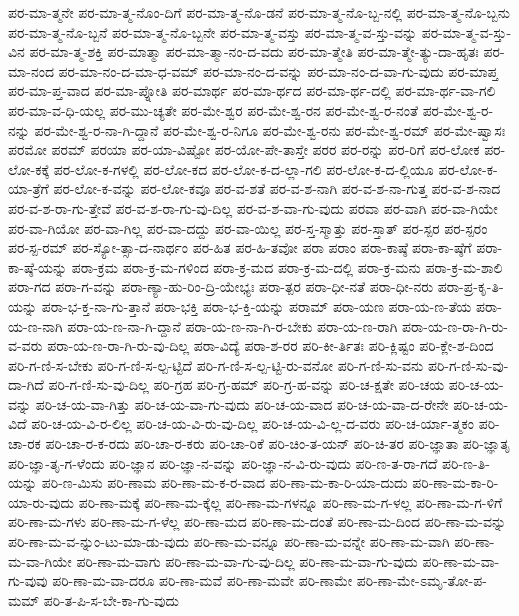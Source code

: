 {ಪರ-ಮಾ-ತ್ಮನೇ
ಪರ-ಮಾ-ತ್ಮ-ನೊಂ-ದಿಗೆ
ಪರ-ಮಾ-ತ್ಮ-ನೊ-ಡನೆ
ಪರ-ಮಾ-ತ್ಮ-ನೊ-ಬ್ಬ-ನಲ್ಲಿ
ಪರ-ಮಾ-ತ್ಮ-ನೊ-ಬ್ಬನು
ಪರ-ಮಾ-ತ್ಮ-ನೊ-ಬ್ಬನೆ
ಪರ-ಮಾ-ತ್ಮ-ನೊ-ಬ್ಬನೇ
ಪರ-ಮಾ-ತ್ಮ-ವಸ್ತು
ಪರ-ಮಾ-ತ್ಮ-ವ-ಸ್ತು-ವನ್ನು
ಪರ-ಮಾ-ತ್ಮ-ವ-ಸ್ತು-ವಿನ
ಪರ-ಮಾ-ತ್ಮ-ಶಕ್ತಿ
ಪರ-ಮಾತ್ಮಾ
ಪರ-ಮಾ-ತ್ಮಾ-ನಂ-ದ-ವದು
ಪರ-ಮಾ-ತ್ಮೇತಿ
ಪರ-ಮಾ-ತ್ಮೇ-ತ್ಯು-ದಾ-ಹೃತಃ
ಪರ-ಮಾ-ನಂದ
ಪರ-ಮಾ-ನಂ-ದ-ಮಾ-ಧ-ವಮ್
ಪರ-ಮಾ-ನಂ-ದ-ವನ್ನು
ಪರ-ಮಾ-ನಂ-ದ-ವಾ-ಗು-ವುದು
ಪರ-ಮಾಪ್ತ
ಪರ-ಮಾ-ಪ್ತ-ವಾದ
ಪರ-ಮಾ-ಪ್ನೋತಿ
ಪರ-ಮಾರ್ಥ
ಪರ-ಮಾ-ರ್ಥದ
ಪರ-ಮಾ-ರ್ಥ-ದಲ್ಲಿ
ಪರ-ಮಾ-ರ್ಥ-ವಾ-ಗಲಿ
ಪರ-ಮಾ-ವ-ಧಿ-ಯಲ್ಲ
ಪರ-ಮು-ಚ್ಯತೇ
ಪರ-ಮೇ-ಶ್ವರ
ಪರ-ಮೇ-ಶ್ವ-ರನ
ಪರ-ಮೇ-ಶ್ವ-ರ-ನಂತೆ
ಪರ-ಮೇ-ಶ್ವ-ರ-ನನ್ನು
ಪರ-ಮೇ-ಶ್ವ-ರ-ನಾ-ಗಿ-ದ್ದಾನೆ
ಪರ-ಮೇ-ಶ್ವ-ರ-ನಿಗೂ
ಪರ-ಮೇ-ಶ್ವ-ರನು
ಪರ-ಮೇ-ಶ್ವ-ರಮ್
ಪರ-ಮೇ-ಷ್ವಾಸಃ
ಪರಮೋ
ಪರಮ್
ಪರಯಾ
ಪರ-ಯಾ-ವಿಷ್ಟೋ
ಪರ-ಯೋ-ಪೇ-ತಾಸ್ತೇ
ಪರರ
ಪರ-ರನ್ನು
ಪರ-ರಿಗೆ
ಪರ-ಲೋಕ
ಪರ-ಲೋ-ಕಕ್ಕೆ
ಪರ-ಲೋ-ಕ-ಗಳಲ್ಲಿ
ಪರ-ಲೋ-ಕದ
ಪರ-ಲೋ-ಕ-ದ-ಲ್ಲಾ-ಗಲಿ
ಪರ-ಲೋ-ಕ-ದ-ಲ್ಲಿಯೂ
ಪರ-ಲೋ-ಕ-ಯಾ-ತ್ರೆಗೆ
ಪರ-ಲೋ-ಕ-ವನ್ನು
ಪರ-ಲೋ-ಕವೂ
ಪರ-ವ-ಶತೆ
ಪರ-ವ-ಶ-ನಾಗಿ
ಪರ-ವ-ಶ-ನಾ-ಗುತ್ತ
ಪರ-ವ-ಶ-ನಾದ
ಪರ-ವ-ಶ-ರಾ-ಗು-ತ್ತೇವೆ
ಪರ-ವ-ಶ-ರಾ-ಗು-ವು-ದಿಲ್ಲ
ಪರ-ವ-ಶ-ವಾ-ಗು-ವುದು
ಪರವಾ
ಪರ-ವಾಗಿ
ಪರ-ವಾ-ಗಿಯೇ
ಪರ-ವಾ-ಗಿಯೋ
ಪರ-ವಾ-ಗಿಲ್ಲ
ಪರ-ವಾ-ದದ್ದು
ಪರ-ವಾ-ಯಿಲ್ಲ
ಪರ-ಸ್ತ-ಸ್ಮಾತ್ತು
ಪರ-ಸ್ತಾತ್
ಪರ-ಸ್ಪರ
ಪರ-ಸ್ಪರಂ
ಪರ-ಸ್ಪ-ರಮ್
ಪರ-ಸ್ಯೋ-ತ್ಸಾ-ದ-ನಾರ್ಥಂ
ಪರ-ಹಿತ
ಪರ-ಹಿ-ತವೋ
ಪರಾ
ಪರಾಂ
ಪರಾ-ಕಾಷ್ಠೆ
ಪರಾ-ಕಾ-ಷ್ಠೆಗೆ
ಪರಾ-ಕಾ-ಷ್ಠೆ-ಯನ್ನು
ಪರಾ-ಕ್ರಮ
ಪರಾ-ಕ್ರ-ಮ-ಗಳಿಂದ
ಪರಾ-ಕ್ರ-ಮದ
ಪರಾ-ಕ್ರ-ಮ-ದಲ್ಲಿ
ಪರಾ-ಕ್ರ-ಮನು
ಪರಾ-ಕ್ರ-ಮ-ಶಾಲಿ
ಪರಾ-ಗದ
ಪರಾ-ಗ-ವನ್ನು
ಪರಾ-ಣ್ಯಾ-ಹು-ರಿಂ-ದ್ರಿ-ಯೇಭ್ಯಃ
ಪರಾ-ತ್ಪರ
ಪರಾ-ಧೀ-ನತೆ
ಪರಾ-ಧೀ-ನರು
ಪರಾ-ಪ್ರ-ಕೃ-ತಿ-ಯನ್ನು
ಪರಾ-ಭ-ಕ್ತ-ನಾ-ಗು-ತ್ತಾನೆ
ಪರಾ-ಭಕ್ತಿ
ಪರಾ-ಭ-ಕ್ತಿ-ಯನ್ನು
ಪರಾಮ್
ಪರಾ-ಯಣ
ಪರಾ-ಯ-ಣ-ತೆಯ
ಪರಾ-ಯ-ಣ-ನಾಗಿ
ಪರಾ-ಯ-ಣ-ನಾ-ಗಿ-ದ್ದಾನೆ
ಪರಾ-ಯ-ಣ-ನಾ-ಗಿ-ರ-ಬೇಕು
ಪರಾ-ಯ-ಣ-ರಾಗಿ
ಪರಾ-ಯ-ಣ-ರಾ-ಗಿ-ರು-ವ-ವರು
ಪರಾ-ಯ-ಣ-ರಾ-ಗಿ-ರು-ವು-ದಿಲ್ಲ
ಪರಾ-ವಿದ್ಯೆ
ಪರಾ-ಶ-ರರ
ಪರಿ-ಕೀ-ರ್ತಿತಃ
ಪರಿ-ಕ್ಲಿಷ್ಟಂ
ಪರಿ-ಕ್ಲೇ-ಶ-ದಿಂದ
ಪರಿ-ಗ-ಣಿ-ಸ-ಬೇಕು
ಪರಿ-ಗ-ಣಿ-ಸ-ಲ್ಪ-ಟ್ಟಿದೆ
ಪರಿ-ಗ-ಣಿ-ಸ-ಲ್ಪ-ಟ್ಟಿ-ರು-ವನೋ
ಪರಿ-ಗ-ಣಿ-ಸು-ವನು
ಪರಿ-ಗ-ಣಿ-ಸು-ವು-ದಾ-ಗಿದೆ
ಪರಿ-ಗ-ಣಿ-ಸು-ವು-ದಿಲ್ಲ
ಪರಿ-ಗ್ರಹ
ಪರಿ-ಗ್ರ-ಹಮ್
ಪರಿ-ಗ್ರ-ಹ-ವನ್ನು
ಪರಿ-ಚ-ಕ್ಷತೇ
ಪರಿ-ಚಯ
ಪರಿ-ಚ-ಯ-ವನ್ನು
ಪರಿ-ಚ-ಯ-ವಾ-ಗಿತ್ತು
ಪರಿ-ಚ-ಯ-ವಾ-ಗು-ವುದು
ಪರಿ-ಚ-ಯ-ವಾದ
ಪರಿ-ಚ-ಯ-ವಾ-ದ-ರೇನೇ
ಪರಿ-ಚ-ಯ-ವಿದೆ
ಪರಿ-ಚ-ಯ-ವಿ-ರ-ಲಿಲ್ಲ
ಪರಿ-ಚ-ಯ-ವಿ-ರು-ವು-ದಿಲ್ಲ
ಪರಿ-ಚ-ಯ-ವಿ-ಲ್ಲ-ದ-ವರು
ಪರಿ-ಚ-ರ್ಯಾ-ತ್ಮಕಂ
ಪರಿ-ಚಾ-ರಕ
ಪರಿ-ಚಾ-ರ-ಕ-ರದು
ಪರಿ-ಚಾ-ರ-ಕರು
ಪರಿ-ಚಾ-ರಿಕೆ
ಪರಿ-ಚಿಂ-ತ-ಯನ್
ಪರಿ-ಚಿ-ತರ
ಪರಿ-ಜ್ಞಾತಾ
ಪರಿ-ಜ್ಞಾತೃ
ಪರಿ-ಜ್ಞಾ-ತೃ-ಗ-ಳೆಂದು
ಪರಿ-ಜ್ಞಾನ
ಪರಿ-ಜ್ಞಾ-ನ-ವನ್ನು
ಪರಿ-ಜ್ಞಾ-ನ-ವಿ-ರು-ವುದು
ಪರಿ-ಣ-ತ-ರಾ-ಗದೆ
ಪರಿ-ಣ-ತಿ-ಯನ್ನು
ಪರಿ-ಣ-ಮಿಸು
ಪರಿ-ಣಾಮ
ಪರಿ-ಣಾ-ಮ-ಕ-ರ-ವಾದ
ಪರಿ-ಣಾ-ಮ-ಕಾ-ರಿ-ಯಾ-ದುದು
ಪರಿ-ಣಾ-ಮ-ಕಾ-ರಿ-ಯಾ-ರು-ವುದು
ಪರಿ-ಣಾ-ಮಕ್ಕೆ
ಪರಿ-ಣಾ-ಮ-ಕ್ಕೆಲ್ಲ
ಪರಿ-ಣಾ-ಮ-ಗಳನ್ನೂ
ಪರಿ-ಣಾ-ಮ-ಗ-ಳಲ್ಲ
ಪರಿ-ಣಾ-ಮ-ಗ-ಳಿಗೆ
ಪರಿ-ಣಾ-ಮ-ಗಳು
ಪರಿ-ಣಾ-ಮ-ಗ-ಳೆಲ್ಲ
ಪರಿ-ಣಾ-ಮದ
ಪರಿ-ಣಾ-ಮ-ದಂತೆ
ಪರಿ-ಣಾ-ಮ-ದಿಂದ
ಪರಿ-ಣಾ-ಮ-ವನ್ನು
ಪರಿ-ಣಾ-ಮ-ವ-ನ್ನುಂ-ಟು-ಮಾ-ಡು-ವುದು
ಪರಿ-ಣಾ-ಮ-ವನ್ನೂ
ಪರಿ-ಣಾ-ಮ-ವನ್ನೇ
ಪರಿ-ಣಾ-ಮ-ವಾಗಿ
ಪರಿ-ಣಾ-ಮ-ವಾ-ಗಿಯೇ
ಪರಿ-ಣಾ-ಮ-ವಾಗು
ಪರಿ-ಣಾ-ಮ-ವಾ-ಗು-ವು-ದಿಲ್ಲ
ಪರಿ-ಣಾ-ಮ-ವಾ-ಗು-ವುದು
ಪರಿ-ಣಾ-ಮ-ವಾ-ಗು-ವುವು
ಪರಿ-ಣಾ-ಮ-ವಾ-ದರೂ
ಪರಿ-ಣಾ-ಮವೆ
ಪರಿ-ಣಾ-ಮವೇ
ಪರಿ-ಣಾಮೇ
ಪರಿ-ಣಾ-ಮೇ-ಽಮೃ-ತೋ-ಪ-ಮಮ್
ಪರಿ-ತ-ಪಿ-ಸ-ಬೇ-ಕಾ-ಗು-ವುದು
}
